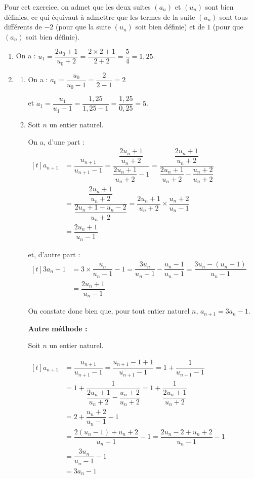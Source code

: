 \medskip

Pour cet exercice, on admet que les deux suites $\left(a_n\right)$ et $\left(u_n\right)$ sont bien définies, ce qui équivaut à admettre que les termes de la suite $(u_n)$ sont tous différents de $-2$ (pour que la suite $\left(u_n\right)$ soit bien définie) et de $1$ (pour que $\left(a_n\right)$ soit bien définie).

\begin{enumerate}
\item On a : $u_{1} = \dfrac{2u_0 + 1}{ u_0 + 2} = \dfrac{2\times 2 + 1}{2 + 2 } = \dfrac{5}{4} = 1,25$.
\item 
	\begin{enumerate}
		\item On a : $a_{0} = \dfrac{u_0}{u_0 -1} = \dfrac{2}{2 - 1} = 2$

et $a_{1} = \dfrac{u_1}{u_1 - 1} = \dfrac{1,25}{1,25-1} = \dfrac{1,25}{0,25} = 5$.
		\item Soit $n$ un entier naturel.

On a, d'une part :\quad
	$\begin{aligned}[t]
a_{n+1} &= \dfrac{u_{n+1}}{u_{n+1}-1} = \dfrac{\dfrac{2u_n + 1}{u_n + 2}}{\dfrac{2u_n + 1}{u_n + 2} - 1} = \dfrac{\dfrac{2u_n + 1}{u_n + 2}}{\dfrac{2u_n + 1}{u_n + 2} - \dfrac{u_n + 2}{u_n + 2}}\\
	&=\dfrac{\dfrac{2u_n + 1}{u_n + 2}}{\dfrac{2u_n + 1- u_n - 2}{u_n + 2}} = \dfrac{2u_n + 1}{u_n + 2} \times \dfrac{u_n+2}{u_n -1}\\
	&=\dfrac{2u_n + 1}{u_n-1}
	\end{aligned}$

et, d'autre part :\quad
	$\begin{aligned}[t]
	3a_{n}-1 &= 3\times \dfrac{u_n}{u_n-1} - 1 = \dfrac{3 u_n}{u_n-1} - \dfrac{u_n-1}{u_n-1} = \dfrac{3u_n - (u_n - 1)}{u_n-1}\\
	&=\dfrac{2u_n + 1}{u_n-1}
	\end{aligned}$

On constate donc bien que, pour tout entier naturel $n$, $a_{n+1}=3 a_{n}-1$.

\textbf{Autre méthode :}

Soit $n$ un entier naturel.

$\begin{aligned}[t]
a_{n+1} & = \dfrac{u_{n+1}}{u_{n+1}-1}  =  \dfrac{u_{n+1}-1+1}{u_{n+1}-1}
= 1+ \dfrac{1}{u_{n+1}-1}\\
& = 1 + \dfrac{1}{\dfrac{2u_n + 1}{u_n + 2} - \dfrac{u_n + 2}{u_n + 2}} 
= 1 + \dfrac{1}{\dfrac{2u_n + 1}{u_n + 2}}\\
	& = 2+ \dfrac{u_n+2}{u_n -1} -1 \\
	& = \dfrac{2 ( u_n-1) + u_n+2}{u_n -1} -1 
	= \dfrac{2 u_n-2 + u_n+2}{u_n -1} -1\\
	& = \dfrac{3u_n}{u_n-1} - 1\\
	& = 3a_{n}-1
\end{aligned}$


\end{enumerate}
\end{enumerate}
